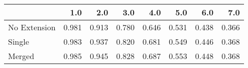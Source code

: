 \begin{tabular}{lrrrrrrr}
\toprule
{} &   1.0 &   2.0 &   3.0 &   4.0 &   5.0 &   6.0 &   7.0 \\
\midrule
No Extension & 0.981 & 0.913 & 0.780 & 0.646 & 0.531 & 0.438 & 0.366 \\
Single       & 0.983 & 0.937 & 0.820 & 0.681 & 0.549 & 0.446 & 0.368 \\
Merged       & 0.985 & 0.945 & 0.828 & 0.687 & 0.553 & 0.448 & 0.368 \\
\bottomrule
\end{tabular}
